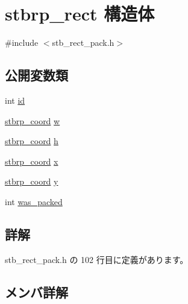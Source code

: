 \hypertarget{structstbrp__rect}{}\section{stbrp\+\_\+rect 構造体}
\label{structstbrp__rect}


{\ttfamily \#include $<$stb\+\_\+rect\+\_\+pack.\+h$>$}

\subsection*{公開変数類}
\begin{DoxyCompactItemize}
\item 
int \mbox{\hyperlink{structstbrp__rect_a92da8626bc99df041c0c3bfd01c25f7a}{id}}
\item 
\mbox{\hyperlink{stb__rect__pack_8h_ac2c2491b95dea6a298b7423dc762dfd9}{stbrp\+\_\+coord}} \mbox{\hyperlink{structstbrp__rect_a248d43f1eb979c1e7b92ba6df431dec5}{w}}
\item 
\mbox{\hyperlink{stb__rect__pack_8h_ac2c2491b95dea6a298b7423dc762dfd9}{stbrp\+\_\+coord}} \mbox{\hyperlink{structstbrp__rect_af68de2dadc7972b7c089d5e0c0558398}{h}}
\item 
\mbox{\hyperlink{stb__rect__pack_8h_ac2c2491b95dea6a298b7423dc762dfd9}{stbrp\+\_\+coord}} \mbox{\hyperlink{structstbrp__rect_a4cc623a3e29f0bc0d3375f6645c84d18}{x}}
\item 
\mbox{\hyperlink{stb__rect__pack_8h_ac2c2491b95dea6a298b7423dc762dfd9}{stbrp\+\_\+coord}} \mbox{\hyperlink{structstbrp__rect_ae3034c1fbf86043b568f5a4dddf946fa}{y}}
\item 
int \mbox{\hyperlink{structstbrp__rect_a74ba347755ce17f2f8a2ea66c612af49}{was\+\_\+packed}}
\end{DoxyCompactItemize}


\subsection{詳解}


 stb\+\_\+rect\+\_\+pack.\+h の 102 行目に定義があります。



\subsection{メンバ詳解}
\mbox{\label{structstbrp__rect_af68de2dadc7972b7c089d5e0c0558398}} 
